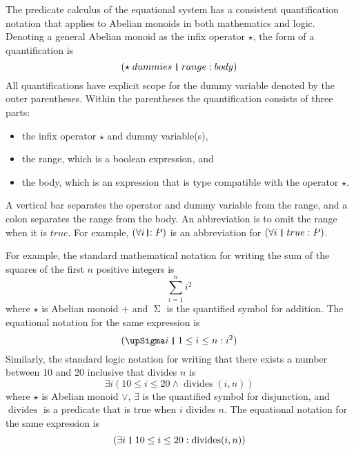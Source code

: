 \documentclass[12pt, fleqn, leqno]{article}
\DeclareMathOperator{\divides}{divides}
\newcommand{\thedr}{\rule[-.25ex]{.32mm}{1.75ex}}   %
\newcommand{\dr}{\;\,\thedr\,\;}                    %
\newcommand{\rb}{:}                                 %
\newcommand{\drrb}{\;\thedr\,{:}\;}                 %
\newcommand{\all}{\forall}                          %
\newcommand{\ext}{\exists}                          %
\begin{document}
The predicate calculus of the equational system has a consistent quantification notation that applies to Abelian monoids in both mathematics and logic.
Denoting a general Abelian monoid as the infix operator $\star$, the form of a quantification is
\[
(\star\; dummies\dr range\rb body)
\]
All quantifications have explicit scope for the dummy variable denoted by the outer parentheses.
Within the parentheses the quantification consists of three parts:
\begin{itemize}
\item the infix operator $\star$ and dummy variable(s),
\item the range, which is a boolean expression, and
\item the body, which is an expression that is type compatible with the operator $\star$.
\end{itemize}
A vertical bar separates the operator and dummy variable from the range, and a colon separates the range from the body.
An abbreviation is to omit the range when it is $true$.
For example, $(\all i\drrb P)$ is an abbreviation for $(\all i\dr true \rb P)$.

For example, the standard mathematical notation for writing the sum of the squares of the first $n$ positive integers is
\[
\sum_{i=1}^{n}i^2
\]
where $\star$ is Abelian monoid $+$ and $\upSigma$ is the quantified symbol for addition.
The equational notation for the same expression is
\[
(\upSigma i\dr 1\le i\le n \rb i^2)
\]
Similarly, the standard logic notation for writing that there exists a number between 10 and 20 inclusive that divides $n$ is
\[
\ext i(10\le i\le 20 \land \divides(i,n))
\]
where $\star$ is Abelian monoid $\lor$, $\ext$ is the quantified symbol for disjunction, and $\divides$ is a predicate that is true when $i$ divides $n$.
The equational notation for the same expression is
\[
(\ext i\dr 10\le i\le 20 \rb \divides(i,n))
\]
\end{document}
